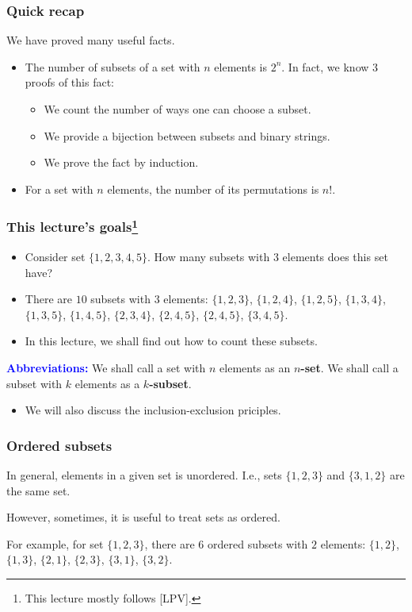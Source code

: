 

\begin{frame}\frametitle{Quick recap}
  We have proved many useful facts.
  \begin{itemize}
  \item The number of subsets of a set with $n$ elements is
    $2^n$. \pause In fact, we know 3 proofs of this fact:
    \begin{itemize}
    \item We count the number of ways one can choose a subset.
    \item We provide a bijection between subsets and binary strings.
    \item We prove the fact by induction.
    \end{itemize}
    \pause
  \item For a set with $n$ elements, the number of its permutations is
    $n!$.
  \end{itemize}
\end{frame}

\begin{frame}\frametitle{This lecture's goals\footnote{This lecture mostly follows [LPV].}}
  \begin{itemize}
  \item Consider set $\{1,2,3,4,5\}$.  How many subsets with $3$
    elements does this set have? \pause
  \item There are $10$ subsets with $3$ elements: $\{1,2,3\}$,
    $\{1,2,4\}$, $\{1,2,5\}$, $\{1,3,4\}$, $\{1,3,5\}$, $\{1,4,5\}$,
    $\{2,3,4\}$, $\{2,4,5\}$, $\{2,4,5\}$, $\{3,4,5\}$.
  \item In this lecture, we shall find out how to count these subsets. \pause
  \end{itemize}

  \begin{tcolorbox}
    {\bf\textcolor{blue}{Abbreviations:}} We shall call a set with $n$ elements as an
    {\bf $n$-set}.  We shall call a subset with $k$ elements as a {\bf
      $k$-subset}.
  \end{tcolorbox}

  \pause

  \begin{itemize}
  \item We will also discuss the inclusion-exclusion priciples.
  \end{itemize}
\end{frame}

\begin{frame}\frametitle{Ordered subsets}
  In general, elements in a given set is unordered.  I.e., sets
  $\{1,2,3\}$ and $\{3,1,2\}$ are the same set. \pause

  However, sometimes, it is useful to treat sets as ordered. \pause

  For example, for set $\{1,2,3\}$, there are $6$ ordered subsets with
  $2$ elements: $\{1,2\}$, $\{1,3\}$, $\{2,1\}$, $\{2,3\}$, $\{3,1\}$,
  $\{3,2\}$.
\end{frame}

